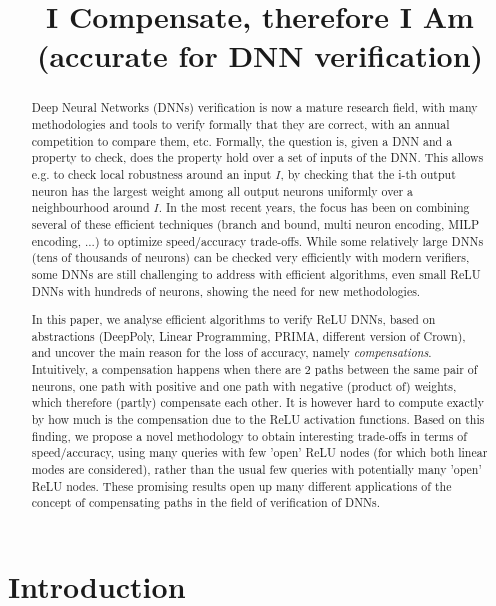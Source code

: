 \documentclass{llncs}
\title{I Compensate, therefore I Am \\ (accurate for DNN verification)}
\date{}
\begin{document}
\maketitle

\begin{abstract}
	Deep Neural Networks (DNNs) verification is now a mature research field, with many methodologies and tools to verify formally that they are correct, with an annual competition to compare them, etc. Formally, the question is, given a DNN and a property to check, does the property hold over a set of inputs of the DNN. This allows e.g. to check local robustness around an input $I$, by checking that the i-th output neuron has the largest weight among all output neurons uniformly over a neighbourhood around $I$.
	In the most recent years, the focus has been on combining several of these efficient techniques (branch and bound, multi neuron encoding, MILP encoding, ...) to optimize speed/accuracy trade-offs. While some relatively large DNNs (tens of thousands of neurons) can be checked very efficiently with modern verifiers, some DNNs are still challenging to address with efficient algorithms, even small ReLU DNNs with hundreds of neurons, showing the need for new methodologies.
  
	In this paper, we analyse efficient algorithms to verify ReLU DNNs, based on abstractions (DeepPoly, Linear Programming, PRIMA, different version of Crown), and uncover the main reason for the loss of accuracy, namely {\em compensations}. Intuitively, a compensation happens when there are 2 paths between the same pair of neurons, one path with positive and one path with negative (product of) weights, which therefore (partly) compensate each other. It is however hard to compute exactly by how much is the compensation due to the ReLU activation functions. Based on this finding, we propose a novel methodology to obtain interesting trade-offs in terms of speed/accuracy, using many queries with few 'open' ReLU nodes (for which both linear modes are considered), rather than the usual few queries with potentially many 'open' ReLU nodes. These promising results open up many different applications of the concept of compensating paths in the field of verification of DNNs.  
\end{abstract}


\section{Introduction}
\end{document}
